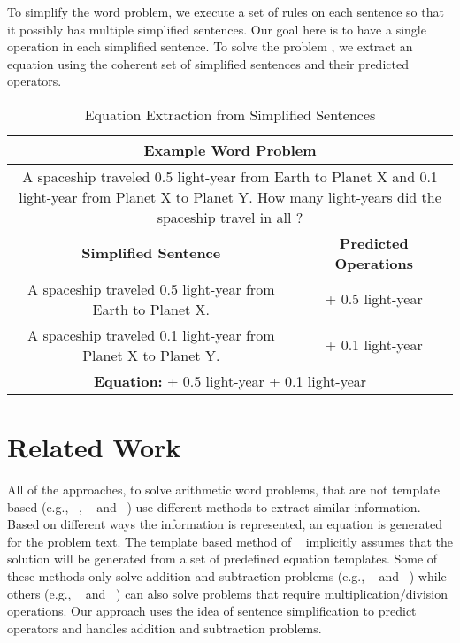 \documentclass[11pt]{article}
\begin{document}
To simplify the word problem, we execute a set of rules on each sentence so that it possibly has multiple simplified sentences. Our goal here is to have a single operation in each simplified sentence. To solve the problem , we extract an equation using the coherent set of simplified sentences and their predicted operators.
\begin{table}[h]
\fontsize{9}{9}
\begin{tabularx}{7.9cm}{|c|c|}
\hline 
\multicolumn{2}{|c|}{\bf{Example Word Problem}} \\ \hline
\multicolumn{2}{|p{7cm}|}{\small A spaceship traveled 0.5 light-year from Earth to Planet X and 0.1 light-year from Planet X to Planet Y. How many light-years did the spaceship travel in all ?} \\ \hline
\multicolumn{1}{|m{5cm}|}{\bf \centering Simplified Sentence} & \multicolumn{1}{m{2cm}|}{\bf \centering Predicted Operations} \\ \hline
\multicolumn{1}{|m{5cm}|}{\small A spaceship traveled 0.5 light-year from Earth to Planet X.} & \multicolumn{1}{m{2cm}|}{\small \centering + 0.5 light-year} \\ \hline
\multicolumn{1}{|m{5cm}|}{\small A spaceship traveled 0.1 light-year from Planet X to Planet Y.} & \multicolumn{1}{m{2cm}|}{\small \centering + 0.1 light-year} \\ \hline
\multicolumn{2}{|m{7cm}|}{\small \centering \textbf{Equation:}  + 0.5 light-year + 0.1 light-year} \\ \hline
\end{tabularx}
\caption{\small \label{figure:1} Equation Extraction from Simplified Sentences }
\end{table}

\section{Related Work}
All of the approaches, to solve arithmetic word problems, that are not template based (e.g., ~\cite{ARIS:14}, ~\cite{RoyT:15} and ~\cite{RoyR:15}) use different methods to extract similar information. Based on different ways the information is represented, an equation is generated for the problem text. The template based method of ~\cite{Kushman:14} implicitly assumes that the solution will be generated from a set of predefined equation templates. Some of these methods only solve addition and subtraction problems (e.g., ~\cite{ARIS:14} and ~\cite{RoyT:15}) while others (e.g., ~\cite{RoyR:15} and ~\cite{Kushman:14}) can also solve problems that require multiplication/division operations. Our approach uses the idea of sentence simplification to predict operators and handles addition and subtraction problems.
\end{document}
